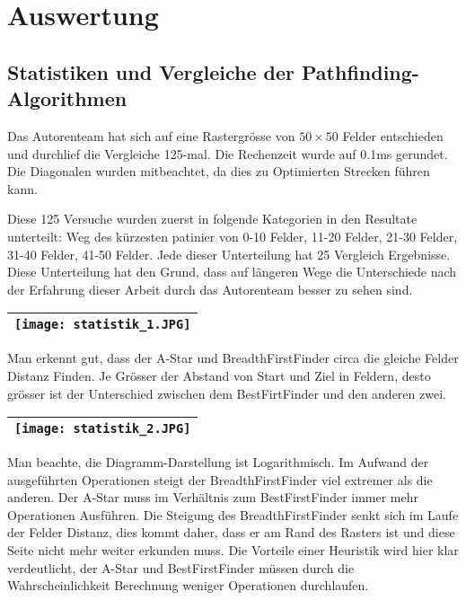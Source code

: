 \chapter{Auswertung}
\section{Statistiken und Vergleiche der Pathfinding-Algorithmen}
\begin{center}
\end{center}

Das Autorenteam hat sich auf eine Rastergrösse von $50\times 50$ Felder
entschieden und durchlief die Vergleiche 125-mal. Die Rechenzeit wurde
auf 0.1ms gerundet. Die Diagonalen wurden mitbeachtet, da dies zu
Optimierten Strecken führen kann.

Diese 125 Versuche wurden zuerst in folgende Kategorien in den Resultate
unterteilt: Weg des kürzesten patinier von 0-10 Felder, 11-20 Felder,
21-30 Felder, 31-40 Felder, 41-50 Felder. Jede dieser Unterteilung hat
25 Vergleich Ergebnisse. Diese Unterteilung hat den Grund, dass auf
längeren Wege die Unterschiede nach der Erfahrung dieser Arbeit durch
das Autorenteam besser zu sehen sind.

\begin{longtable}[]{@{}l@{}}
\toprule
\endhead
\texttt{[image: statistik\_1.JPG]}\tabularnewline
\bottomrule
\end{longtable}

Man erkennt gut, dass der A-Star und BreadthFirstFinder circa die gleiche
Felder Distanz Finden. Je Grösser der Abstand von Start und Ziel in
Feldern, desto grösser ist der Unterschied zwischen dem BestFirtFinder
und den anderen zwei.

\begin{longtable}[]{@{}l@{}}
\toprule
\endhead
\texttt{[image: statistik\_2.JPG]}\tabularnewline
\bottomrule
\end{longtable}

Man beachte, die Diagramm-Darstellung ist Logarithmisch. Im Aufwand der
ausgeführten Operationen steigt der BreadthFirstFinder viel extremer als
die anderen. Der A-Star muss im Verhältnis zum BestFirstFinder immer
mehr Operationen Ausführen. Die Steigung des BreadthFirstFinder senkt
sich im Laufe der Felder Distanz, dies kommt daher, dass er am Rand des
Rasters ist und diese Seite nicht mehr weiter erkunden muss. Die
Vorteile einer Heuristik wird hier klar verdeutlicht, der A-Star und
BestFirstFinder müssen durch die Wahrscheinlichkeit Berechnung weniger
Operationen durchlaufen.

